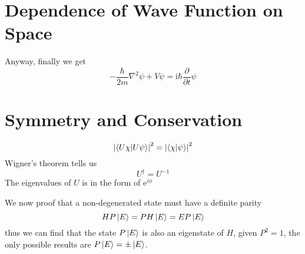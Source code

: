 \chapter[波函数对于空间的依赖]{Dependence of Wave Function on Space}
Anyway, finally we get 
\begin{equation}
  -\frac{\hbar}{2m} \nabla^2 \psi + V \psi = \mathrm{i} \hbar \frac{\partial }{\partial t} \psi
\end{equation}

\chapter[对称性与守恒律]{Symmetry and Conservation}
\begin{equation}
  \left| \bra{U\chi} \ket{U\psi} \right| ^{2} = \left| \bra{\chi} \ket{\psi} \right| ^{2}
\end{equation}
Wigner's theorem tells us
\begin{equation}
  U^{\dagger} = U ^{-1}
\end{equation}
The eigenvalues of $U$ is in the form of $\mathrm{e}^{i\phi}$

We now proof that a non-degenerated state must have a definite parity 
\begin{equation}
  H P \ket{E} = P H \ket{E} = E P \ket{E}
\end{equation}
thus we can find that the state $P \ket{E}$ is also an eigenstate of $H$, given $P^{2} = 1$, the only possible results are $P \ket{E} = \pm \ket{E}$.
